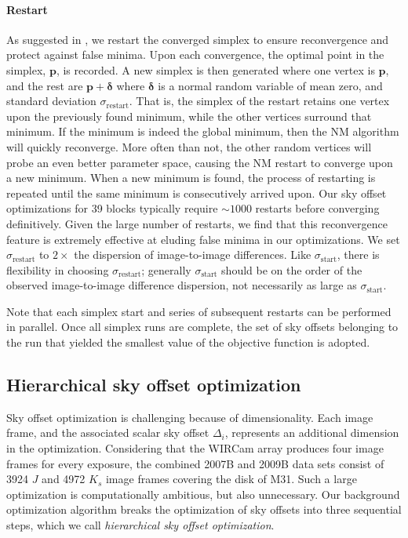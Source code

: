 \documentclass[iop]{emulateapj}
\newcommand{\vect}[1]{\boldsymbol{#1}} %
\begin{document}
\paragraph{Restart} As suggested in \cite{Press:2007}, we restart the converged simplex to ensure reconvergence and protect against false minima.
Upon each convergence, the optimal point in the simplex, $\vect{p}$, is recorded.
A new simplex is then generated where one vertex is $\vect{p}$, and the rest are $\vect{p}+\vect{\delta}$ where $\vect{\delta}$ is a normal random variable of mean zero, and standard deviation $\sigma_\mathrm{restart}$.
That is, the simplex of the restart retains one vertex upon the previously found minimum, while the other vertices surround that minimum.
If the minimum is indeed the global minimum, then the NM algorithm will quickly reconverge.
More often than not, the other random vertices will probe an even better parameter space, causing the NM restart to converge upon a new minimum.
When a new minimum is found, the process of restarting is repeated until the same minimum is consecutively arrived upon.
Our sky offset optimizations for 39 blocks typically require $\sim1000$ restarts before converging definitively.
Given the large number of restarts, we find that this reconvergence feature is extremely effective at eluding false minima in our optimizations.
We set $\sigma_\mathrm{restart}$ to $2\times$ the dispersion of image-to-image differences.
Like $\sigma_\mathrm{start}$, there is flexibility in choosing $\sigma_\mathrm{restart}$; generally $\sigma_\mathrm{start}$ should be on the order of the observed image-to-image difference dispersion, not necessarily as large as $\sigma_\mathrm{start}$.

Note that each simplex start and series of subsequent restarts can be performed in parallel.
Once all simplex runs are complete, the set of sky offsets belonging to the run that yielded the smallest value of the objective function is adopted.

\subsection{Hierarchical sky offset optimization}
\label{sec:hierarchical_algo}

Sky offset optimization is challenging because of dimensionality.
Each image frame, and the associated scalar sky offset $\Delta_i$, represents an additional dimension in the optimization.
Considering that the WIRCam array produces four image frames for every exposure, the combined 2007B and 2009B data sets consist of 3924 $J$ and 4972 $K_s$ image frames covering the disk of M31.
Such a large optimization is computationally ambitious, but also unnecessary.
Our background optimization algorithm breaks the optimization of sky offsets into three sequential steps, which we call \emph{hierarchical sky offset optimization}.
\end{document}
